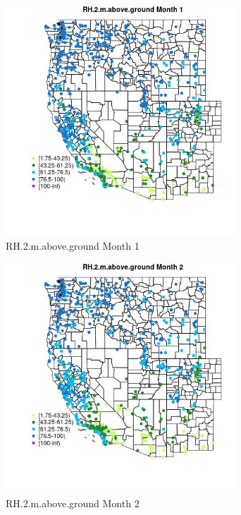 \begin{figure} 
\centering  
\includegraphics[width=0.77\textwidth]{Code_Outputs/Report_ML_input_PM25_Step4_part_f_de_duplicated_aveswNAs_MapObsMo1RH2maboveground.jpg} 
\caption{\label{fig:Report_ML_input_PM25_Step4_part_f_de_duplicated_aveswNAsMapObsMo1RH2maboveground}RH.2.m.above.ground Month 1} 
\end{figure} 
 

\begin{figure} 
\centering  
\includegraphics[width=0.77\textwidth]{Code_Outputs/Report_ML_input_PM25_Step4_part_f_de_duplicated_aveswNAs_MapObsMo2RH2maboveground.jpg} 
\caption{\label{fig:Report_ML_input_PM25_Step4_part_f_de_duplicated_aveswNAsMapObsMo2RH2maboveground}RH.2.m.above.ground Month 2} 
\end{figure} 
 

